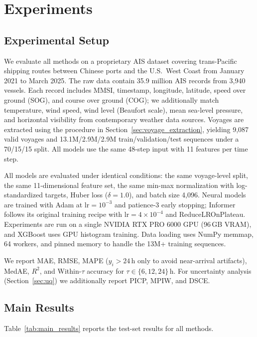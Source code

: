 \documentclass[sigconf,anonymous]{acmart}%
\begin{document}
\section{Experiments}

\subsection{Experimental Setup}

We evaluate all methods on a proprietary AIS dataset covering trans-Pacific shipping routes between Chinese ports and the U.S.\ West Coast from January 2021 to March 2025. The raw data contain 35.9 million AIS records from 3,940 vessels. Each record includes MMSI, timestamp, longitude, latitude, speed over ground (SOG), and course over ground (COG); we additionally match temperature, wind speed, wind level (Beaufort scale), mean sea-level pressure, and horizontal visibility from contemporary weather data sources. Voyages are extracted using the procedure in Section~\ref{sec:voyage_extraction}, yielding 9,087 valid voyages and 13.1M/2.9M/2.9M train/validation/test sequences under a 70/15/15 split. All models use the same 48-step input with 11 features per time step.

All models are evaluated under identical conditions: the same voyage-level split, the same 11-dimensional feature set, the same min-max normalization with log-standardized targets, Huber loss ($\delta = 1.0$), and batch size 4,096. Neural models are trained with Adam at $\mathrm{lr}=10^{-3}$ and patience-3 early stopping; Informer follows its original training recipe with $\mathrm{lr}=4\times 10^{-4}$ and ReduceLROnPlateau. Experiments are run on a single NVIDIA RTX PRO 6000 GPU (96\,GB VRAM), and XGBoost uses GPU histogram training. Data loading uses NumPy memmap, 64 workers, and pinned memory to handle the 13M+ training sequences.

We report MAE, RMSE, MAPE ($y_i{>}24$\,h only to avoid near-arrival artifacts), MedAE, $R^2$, and Within-$\tau$ accuracy for $\tau{\in}\{6,12,24\}$\,h. For uncertainty analysis (Section~\ref{sec:uq}) we additionally report PICP, MPIW, and DSCE.


\subsection{Main Results}

Table~\ref{tab:main_results} reports the test-set results for all methods.
\end{document}

